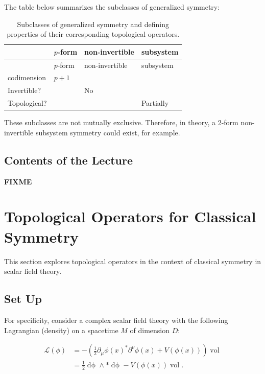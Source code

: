 \documentclass[
  letterpaper,
  DIV=11,
  numbers=noendperiod]{scrreport}
\DeclareMathOperator{\vol}{vol}
\newcommand{\stdim}{D}
\begin{document}
The table below summarizes the subclasses of generalized symmetry:

\begin{longtable}[]{@{}llll@{}}
\caption{Subclasses of generalized symmetry and defining properties of
their corresponding topological
operators.}\label{tbl-sym-classes}\tabularnewline
\toprule\noalign{}
& \(p\)-form & non-invertible & subsystem \\
\midrule\noalign{}
\endfirsthead
\toprule\noalign{}
& \(p\)-form & non-invertible & subsystem \\
\midrule\noalign{}
\endhead
\bottomrule\noalign{}
\endlastfoot
codimension & \(p+1\) & & \\
Invertible? & & No & \\
Topological? & & & Partially \\
\end{longtable}

These subclasses are not mutually exclusive. Therefore, in theory, a
2-form non-invertible subsystem symmetry could exist, for example.

\section{Contents of the Lecture}\label{contents-of-the-lecture}

\textbf{FIXME}


\chapter{Topological Operators for Classical Symmetry}\label{sec-scalar}

This section explores topological operators in the context of classical
symmetry in scalar field theory.

\section{Set Up}\label{set-up}

For specificity, consider a complex scalar field theory with the
following Lagrangian (density) on a spacetime \(M\) of dimension
\(\stdim\):

\[
\begin{aligned}
\mathcal{L}(\phi) &=  - \left(\frac12 \partial_\mu \phi(x)^* \partial^\nu \phi(x) + V(\phi(x))\right)\vol\\
&= \frac{1}{2} \mathop{d\phi} \wedge *\mathop{d\phi} - V(\phi(x))\vol.
\end{aligned}
\]
\end{document}
